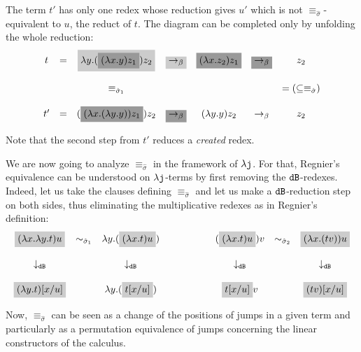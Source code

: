 \documentclass{LMCS}
\newcommand{\sep}{\hspace*{0.5cm}}
\renewcommand{\>}{\rightarrow}
\def\lam{\lambda}
\newcommand{\Rew}[1]{\rightarrow_{#1}}
\newcommand{\B}{{\tt dB}}
\newcommand{\dis}{{\tt j}}
\newcommand{\ldis}{\lam{\dis}}
\newcommand{\Beta}{{\tt \beta}}
\newcommand{\eqw}[1]{\equiv_{#1}}
\newcommand{\preeqw}[1]{\sim_{#1}}
\def\rsig{\hat{\sigma}}
\newcommand{\grisar}[1]{\colorbox{LightGray}{\ensuremath{#1}}}
\newcommand{\grisarOscuro}[1]{\colorbox{DarkGray}{\ensuremath{#1}}}
\begin{document}
The
term $t'$ has only one redex whose reduction gives $u'$
which is not $\eqw{\rsig}$-equivalent to $u$,  the reduct of $t$. The
diagram can be completed only by unfolding the whole reduction:
\[ \begin{array}{cccccccc}
t&=&\grisar{\lam y. (\grisarOscuro{(\lam x.y) z_1}) z_2}  & \grisar{\Rew{\Beta}} &
\grisarOscuro{(\lam x.z_2) z_1} &\grisarOscuro{\Rew{\beta}}& z_2\\
\\
&&\eqw{\rsig_1}&&&&= (\subseteq \eqw{\rsig})
\\\\
t'&=&(\grisarOscuro{(\lam x. (\lam y. y)) z_1}) z_2   & \grisarOscuro{\Rew{\Beta}} & (\lam y. y) z_2&\Rew{\beta}& z_2
\end{array}\] 


Note that the second step from $t'$ reduces a {\it created} redex. \medskip

We are now going to analyze $\eqw{\rsig}$ 
in the framework of $\ldis$.  For that, Regnier's equivalence
can be understood on $\ldis$-terms by first removing the $\B$-redexes. Indeed,
let us take the clauses defining $\eqw{\rsig}$ and let us make a 
$\B$-reduction step on both sides, thus eliminating the multiplicative
redexes as in Regnier's definition:
\[ \begin{array}{ccc@{\sep\sep\sep\sep}ccc}
 \grisar{(\lam x. \lam y. t) u} & \preeqw{\rsig_1}&  \lam y. (\grisar{(\lam x.t) u})
& (\grisar{(\lam x. t) u}) v& \preeqw{\rsig_2} & \grisar{(\lam x. (t v)) u}\\ \\
\downarrow_\B & &  	\downarrow_\B &
\downarrow_\B & &  	\downarrow_\B \\ \\
 \grisar{(\lam y. t)[x/u]}	&  &\lam y. (\grisar{t [x/u]}) &
\grisar{t[x/u]} v & & \grisar{(t v)[x/u]}
\end{array}\] 

Now,  $\eqw{\rsig}$ can be seen
as a change of the positions of jumps in a given term and particularly
as a permutation equivalence of jumps concerning the linear constructors of the
calculus.
\end{document}
